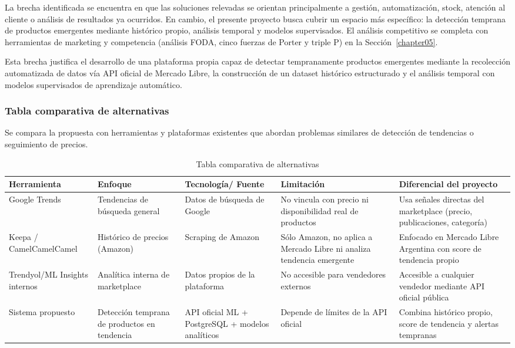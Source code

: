 La brecha identificada se encuentra en que las soluciones relevadas se orientan principalmente a gestión, automatización, stock, atención al cliente o análisis de resultados ya ocurridos. En cambio, el presente proyecto busca cubrir un espacio más específico: la detección temprana de productos emergentes mediante histórico propio, análisis temporal y modelos supervisados. El análisis competitivo se completa con herramientas de marketing y competencia (análisis FODA, cinco fuerzas de Porter y triple P) en la Sección~\ref{chapter05}.

Esta brecha justifica el desarrollo de una plataforma propia capaz de detectar tempranamente productos emergentes mediante la recolección automatizada de datos vía API oficial de Mercado Libre, la construcción de un dataset histórico estructurado y el análisis temporal con modelos supervisados de aprendizaje automático.

\subsubsection{Tabla comparativa de alternativas}

Se compara la propuesta con herramientas y plataformas existentes que abordan problemas similares de detección de tendencias o seguimiento de precios.

\begin{table}[ht]
	\centering
	\caption{Tabla comparativa de alternativas}
	\label{tab:comparativa}
	\small
	\begin{tabularx}{\textwidth}{@{}>{\raggedright\arraybackslash}p{2.2cm} >{\raggedright\arraybackslash}p{2.6cm} >{\raggedright\arraybackslash}p{2.7cm} >{\raggedright\arraybackslash}p{2.7cm} X@{}}
		\toprule
		\textbf{Herramienta} & \textbf{Enfoque} & \textbf{Tecnología/ Fuente} & \textbf{Limitación} & \textbf{Diferencial del proyecto} \\
		\midrule
		Google Trends & Tendencias de búsqueda general & Datos de búsqueda de Google & No vincula con precio ni disponibilidad real de productos & Usa señales directas del marketplace (precio, publicaciones, categoría) \\
		Keepa / CamelCamelCamel & Histórico de precios (Amazon) & Scraping de Amazon & Sólo Amazon, no aplica a Mercado Libre ni analiza tendencia emergente & Enfocado en Mercado Libre Argentina con score de tendencia propio \\
		Trendyol/ML Insights internos & Analítica interna de marketplace & Datos propios de la plataforma & No accesible para vendedores externos & Accesible a cualquier vendedor mediante API oficial pública \\
		Sistema propuesto & Detección temprana de productos en tendencia & API oficial ML + PostgreSQL + modelos analíticos & Depende de límites de la API oficial & Combina histórico propio, score de tendencia y alertas tempranas \\
		\bottomrule
	\end{tabularx}
\end{table}

